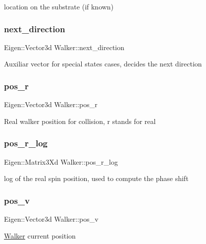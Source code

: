 location on the substrate (if known) \mbox{\label{class_walker_ad1629485a13c80367a563ed7b88149eb}} 
\subsubsection{\texorpdfstring{next\+\_\+direction}{next\_direction}}
{\footnotesize\ttfamily Eigen\+::\+Vector3d Walker\+::next\+\_\+direction}

Auxiliar vector for special states cases, decides the next direction \mbox{\label{class_walker_a1008a95833c1f74b53f02e57e84417b7}} 
\subsubsection{\texorpdfstring{pos\+\_\+r}{pos\_r}}
{\footnotesize\ttfamily Eigen\+::\+Vector3d Walker\+::pos\+\_\+r}

Real walker position for collision, r stands for real \mbox{\label{class_walker_a1ba5a46fddf62eb3eeaabc7c868afe07}} 
\subsubsection{\texorpdfstring{pos\+\_\+r\+\_\+log}{pos\_r\_log}}
{\footnotesize\ttfamily Eigen\+::\+Matrix3\+Xd Walker\+::pos\+\_\+r\+\_\+log}

log of the real spin position, used to compute the phase shift \mbox{\label{class_walker_a2c1bf5a8da9e8f3a230a22ab4ae0e373}} 
\subsubsection{\texorpdfstring{pos\+\_\+v}{pos\_v}}
{\footnotesize\ttfamily Eigen\+::\+Vector3d Walker\+::pos\+\_\+v}

\hyperlink{class_walker}{Walker} current position \mbox{\label{class_walker_a62d99cc92226681123be94e64fb2bf7b}} 
